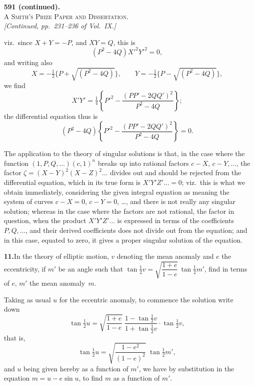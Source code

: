 \documentclass[11pt]{article}
\begin{document}

\begin{center}
{\large\textbf{591 (continued).}}\\[2pt]
{\scshape A Smith's Prize Paper and Dissertation.}\\[6pt]
\textit{[Continued, pp.\ 231--236 of Vol.\ IX.]}
\end{center}

\medskip

\noindent viz.\ since $X+Y=-P$, and $XY=Q$, this is
\[
(P^{2}-4Q)X'^{2}Y'^{2}=0,
\]
and writing also
\[
X=-\tfrac{1}{2}\{P+\sqrt{(P^{2}-4Q)}\}, \qquad Y=-\tfrac{1}{2}\{P-\sqrt{(P^{2}-4Q)}\},
\]
we find
\[
X'Y'=\tfrac{1}{4}\left\{P'^{2}-\frac{(PP'-2QQ')^{2}}{P^{2}-4Q}\right\};
\]
the differential equation thus is
\[
(P^{2}-4Q)\left\{P'^{2}-\frac{(PP'-2QQ')^{2}}{P^{2}-4Q}\right\}=0.
\]

The application to the theory of singular solutions is that, in the case where the
function $(1,P,Q,\ldots)(c,1)^{n}$ breaks up into rational factors $c-X$, $c-Y,\ldots$,
the factor $\zeta=(X-Y)^{2}(X-Z)^{2}\ldots$ divides out and should be rejected from the
differential equation, which in its true form is $X'Y'Z'\ldots=0$; viz.\ this is what we
obtain immediately, considering the given integral equation as meaning the system of
curves $c-X=0$, $c-Y=0$, \ldots, and there is not really any singular solution; whereas
in the case where the factors are not rational, the factor in question, when the
product $X'Y'Z'\ldots$ is expressed in terms of the coefficients $P,Q,\ldots$, and their
derived coefficients does not divide out from the equation; and in this case, equated
to zero, it gives a proper singular solution of the equation.

\medskip
\noindent\textbf{11.}\quad In the theory of elliptic motion, $v$ denoting the mean
anomaly and $e$ the eccentricity, if $m'$ be an angle such that
$\tan\tfrac{1}{2}v=\sqrt{\dfrac{1+e}{1-e}}\,\tan\tfrac{1}{2}m'$, find in terms of $e$, $m'$ the
mean anomaly~$m$.

\medskip
Taking as usual $u$ for the eccentric anomaly, to commence the solution write down
\[
\tan\tfrac{1}{2}u=\sqrt{\frac{1+e}{1-e}}\;\frac{1-\tan\tfrac{1}{2}v}{1+\tan\tfrac{1}{2}v}\cdot\tan\tfrac{1}{2}v,
\]
that is,
\[
\tan\tfrac{1}{2}u=\sqrt{\frac{1-e^{2}}{(1-e)^{2}}}\;\tan\tfrac{1}{2}m',
\]
and $u$ being given hereby as a function of $m'$, we have by substitution in the
equation $m=u-e\sin u$, to find $m$ as a function of $m'$.
\end{document}

